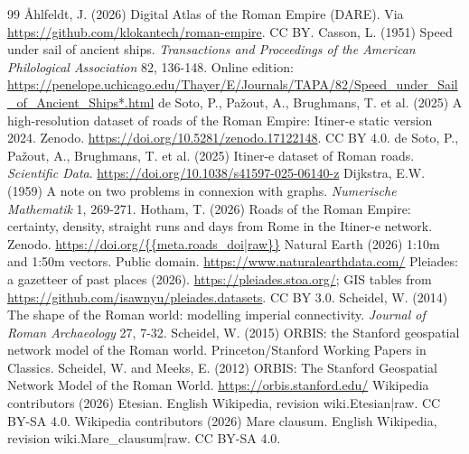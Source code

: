 \documentclass[11pt,a4paper]{article}
\begin{document}
\begin{thebibliography}{99}
 {\AA}hlfeldt, J. (2026) Digital Atlas of the Roman Empire (DARE). Via \url{https://github.com/klokantech/roman-empire}. CC BY.
 Casson, L. (1951) Speed under sail of ancient ships. \emph{Transactions and Proceedings of the American Philological Association} 82, 136-148. Online edition: \url{https://penelope.uchicago.edu/Thayer/E/Journals/TAPA/82/Speed_under_Sail_of_Ancient_Ships*.html}
 de Soto, P., Pa\v{z}out, A., Brughmans, T. et al. (2025) A high-resolution dataset of roads of the Roman Empire: Itiner-e static version 2024. Zenodo. \url{https://doi.org/10.5281/zenodo.17122148}. CC BY 4.0.
 de Soto, P., Pa\v{z}out, A., Brughmans, T. et al. (2025) Itiner-e dataset of Roman roads. \emph{Scientific Data}. \url{https://doi.org/10.1038/s41597-025-06140-z}
 Dijkstra, E.W. (1959) A note on two problems in connexion with graphs. \emph{Numerische Mathematik} 1, 269-271.
 Hotham, T. (2026) Roads of the Roman Empire: certainty, density, straight runs and days from Rome in the Itiner-e network. Zenodo. \url{https://doi.org/{{meta.roads_doi|raw}}}
 Natural Earth (2026) 1:10m and 1:50m vectors. Public domain. \url{https://www.naturalearthdata.com/}
 Pleiades: a gazetteer of past places (2026). \url{https://pleiades.stoa.org/}; GIS tables from \url{https://github.com/isawnyu/pleiades.datasets}. CC BY 3.0.
 Scheidel, W. (2014) The shape of the Roman world: modelling imperial connectivity. \emph{Journal of Roman Archaeology} 27, 7-32.
 Scheidel, W. (2015) ORBIS: the Stanford geospatial network model of the Roman world. Princeton/Stanford Working Papers in Classics.
 Scheidel, W. and Meeks, E. (2012) ORBIS: The Stanford Geospatial Network Model of the Roman World. \url{https://orbis.stanford.edu/}
 Wikipedia contributors (2026) Etesian. English Wikipedia, revision {{wiki.Etesian|raw}}. CC BY-SA 4.0.
 Wikipedia contributors (2026) Mare clausum. English Wikipedia, revision {{wiki.Mare_clausum|raw}}. CC BY-SA 4.0.
\end{thebibliography}
\end{document}
